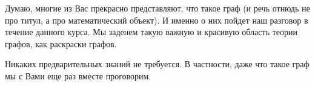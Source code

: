 



Думаю, многие из Вас прекрасно представляют, что такое граф
(и речь отнюдь не про титул, а про математический объект).
И именно о них пойдет наш разговор в течение данного курса.
Мы заденем такую важную и красивую область теории графов, как раскраски графов.

Никаких предварительных знаний не требуется.
В частности, даже что такое граф мы с Вами еще раз вместе проговорим.

